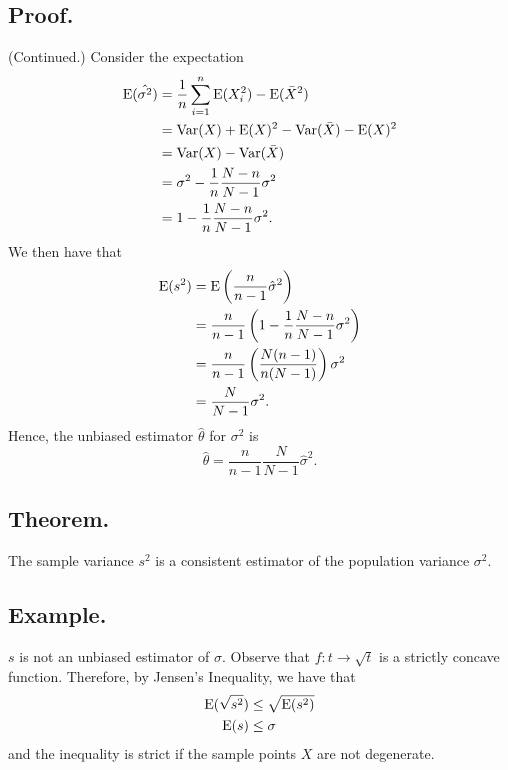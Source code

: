 \documentclass[titlepage]{article}
\begin{document}
\subsection{Proof.} (Continued.) Consider the expectation 
\begin{align*}
    \text{E}(\hat{\sigma^{2}}) &= \frac{1}{n}\sum_{i=1}^{n}\text{E}(X_{i}^{2}) - \text{E}(\bar{X}^{2}) \\
                         &= \text{Var}(X) + \text{E}(X)^{2} - \text{Var}(\bar{X}) - \text{E}(X)^{2} \\
                         &= \text{Var}(X) - \text{Var}(\bar{X}) \\
                         &= \sigma^{2} - \frac{1}{n}\frac{N-n}{N-1}\sigma^{2} \\
                         &= 1 - \frac{1}{n}\frac{N-n}{N-1}\sigma^{2}.
\end{align*}
We then have that 
\begin{align*}
    \text{E}(s^{2}) &= \text{E}\left(\frac{n}{n-1}\hat{\sigma}^{2}\right) \\
              &= \frac{n}{n-1}\left(1 - \frac{1}{n}\frac{N-n}{N-1}\sigma^{2}\right) \\
              &= \frac{n}{n-1}\left(\frac{N(n-1)}{n(N-1)}\right)\sigma^{2} \\
              &= \frac{N}{N-1}\sigma^{2}.
\end{align*}
Hence, the unbiased estimator $\hat{\theta}$ for $\sigma^{2}$ is
$$\hat{\theta} = \frac{n}{n-1}\frac{N}{N-1}\hat{\sigma}^{2}.$$

\subsection{Theorem.} The sample variance $s^{2}$ is a consistent estimator of the population variance $\sigma^{2}$.

\subsection{Example.} $s$ is not an unbiased estimator of $\sigma$. Observe that $f: t \to \sqrt{t}$ is a strictly concave function. Therefore, by Jensen's Inequality, we have that
\begin{align*}
    \text{E}(\sqrt{s^{2}}) &\leq \sqrt{\text{E}(s^{2})} \\
               \text{E}(s) &\leq \sigma
\end{align*}
and the inequality is strict if the sample points $X$ are not degenerate.

\newpage {}
\end{document}
